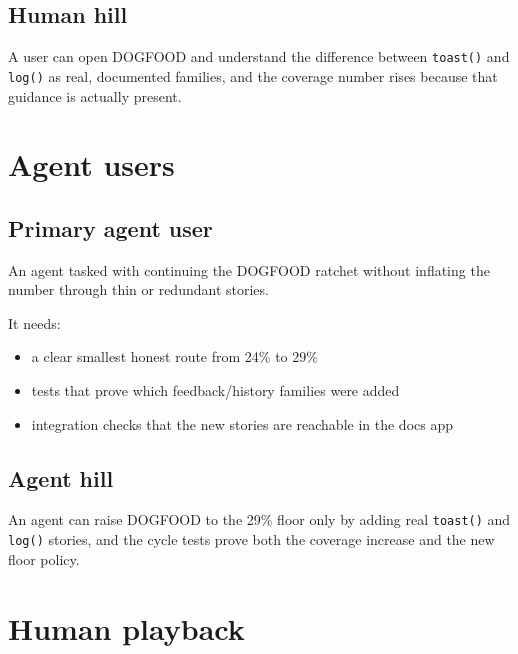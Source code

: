 \subsection{Human hill}\label{record-069-human-hill}

A user can open DOGFOOD and understand the difference between \texttt{t\allowbreak{}o\allowbreak{}a\allowbreak{}s\allowbreak{}t\allowbreak{}(\allowbreak{})} and \texttt{l\allowbreak{}o\allowbreak{}g\allowbreak{}(\allowbreak{})} as real, documented families, and the coverage number rises because that guidance is actually present.

\section{Agent users}\label{record-069-agent-users}

\subsection{Primary agent user}\label{record-069-primary-agent-user}

An agent tasked with continuing the DOGFOOD ratchet without inflating the number through thin or redundant stories.

It needs:

\begin{itemize}
\tightlist
\item
  a clear smallest honest route from 24\% to 29\%
\item
  tests that prove which feedback/history families were added
\item
  integration checks that the new stories are reachable in the docs app
\end{itemize}

\subsection{Agent hill}\label{record-069-agent-hill}

An agent can raise DOGFOOD to the 29\% floor only by adding real \texttt{t\allowbreak{}o\allowbreak{}a\allowbreak{}s\allowbreak{}t\allowbreak{}(\allowbreak{})} and \texttt{l\allowbreak{}o\allowbreak{}g\allowbreak{}(\allowbreak{})} stories, and the cycle tests prove both the coverage increase and the new floor policy.

\section{Human playback}\label{record-069-human-playback}

